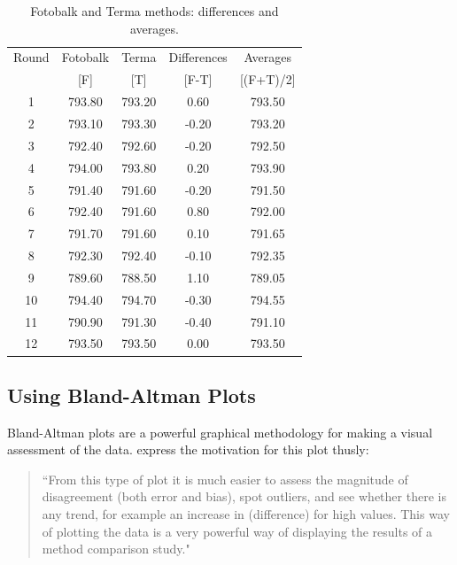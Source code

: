 \documentclass[Main.tex]{subfiles}
\begin{document}
	\begin{table}[h!]
		\renewcommand\arraystretch{0.7}%
		\begin{center}
			\begin{tabular}{|c||c|c||c|c|}
				\hline
				Round & Fotobalk  & Terma  & Differences  & Averages  \\
				&  [F] & [T] & [F-T] &  [(F+T)/2] \\
				\hline
				1 & 793.80 & 793.20 & 0.60 & 793.50 \\
				2 & 793.10 & 793.30 & -0.20 & 793.20 \\
				3 & 792.40 & 792.60 & -0.20 & 792.50 \\
				4 & 794.00 & 793.80 & 0.20 & 793.90 \\
				5 & 791.40 & 791.60 & -0.20 & 791.50 \\
				6 & 792.40 & 791.60 & 0.80 & 792.00 \\
				7 & 791.70 & 791.60 & 0.10 & 791.65 \\
				8 & 792.30 & 792.40 & -0.10 & 792.35 \\
				9 & 789.60 & 788.50 & 1.10 & 789.05 \\
				10 & 794.40 & 794.70 & -0.30 & 794.55 \\
				11 & 790.90 & 791.30 & -0.40 & 791.10 \\
				12 & 793.50 & 793.50 & 0.00 & 793.50 \\
				
				\hline
			\end{tabular}
			\caption{Fotobalk and Terma methods: differences and averages.}
		\end{center}
	\end{table}
	
	\newpage
	
	
	\subsection{Using Bland-Altman Plots}
	Bland-Altman plots are a powerful graphical methodology for making
	a visual assessment of the data. \citet*{BA83} express the
	motivation for this plot thusly:
	\begin{quote}
		``From this type of plot it is much easier to assess the magnitude
		of disagreement (both error and bias), spot outliers, and see
		whether there is any trend, for example an increase in
		(difference) for high values. This way of plotting the data is a
		very powerful way of displaying the results of a method comparison
		study."
	\end{quote}
	
\end{document}
